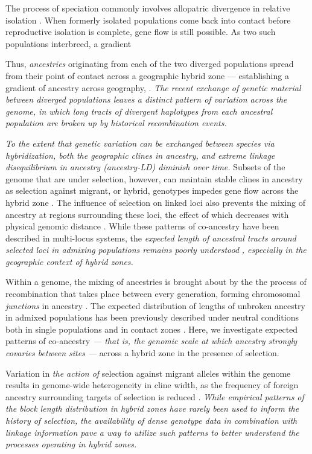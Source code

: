 \documentclass[11pt,letterpaper]{article}
\newcommand{\alisa}[1]{{\em \color{red} #1}}
\newcommand{\yb}[1]{{\em \color{magenta} #1}}
\begin{document}
The process of speciation commonly involves allopatric divergence in relative isolation \citep{Coyne2004}.  
When formerly isolated populations come back into contact 
before reproductive isolation is complete, gene flow is still possible. 
As two such populations interbreed,
a gradient

Thus, \alisa{ancestries} originating from each of the two diverged populations spread from their point of contact across a geographic hybrid zone 
--- establishing a gradient of ancestry across geography, \citep{Barton1985}. 
\yb{The recent exchange of genetic material between diverged populations leaves a distinct pattern of variation across the genome, in which long tracts of divergent haplotypes from each ancestral population  are broken up by historical recombination events.}  


\yb{To the extent that  genetic variation can be exchanged between species via hybridization, both the geographic clines in ancestry, and extreme linkage disequilibrium in ancestry (ancestry-LD) diminish over time.} Subsets of the genome that are under selection, however, can maintain stable clines in ancestry as selection against migrant, or hybrid, genotypes impedes gene flow across the hybrid zone \citep{Barton1979a}. The influence of selection on linked loci also prevents the mixing of ancestry at regions surrounding these loci, the effect of which decreases with physical genomic distance \citep{Barton1986,Barton1983}. While these patterns of co-ancestry have been described in multi-locus systems, the  \yb{expected length of ancestral tracts around selected loci in admixing populations remains poorly understood}\alisa{, especially in the geographic context of hybrid zones.}


Within a genome, the mixing of ancestries is brought about by the the process of recombination that takes place between every generation, forming chromosomal \emph{junctions} in ancestry \citep{Fisher1954, Chapman2002, Baird2003}.   
The expected distribution of lengths of unbroken ancestry in admixed populations has been previously described under neutral conditions both in single populations and in contact zones \citep[e.g.][]{Gravel2012,Sedghifar2015}.  Here, we investigate expected patterns of co-ancestry \yb{ --- that is, the genomic scale at which ancestry strongly covaries between sites --- } across a hybrid zone in the presence of selection. 

Variation in \yb{ the action of } selection against migrant alleles within the genome results in genome-wide heterogeneity in cline width, as the frequency of foreign ancestry surrounding targets of selection is reduced \citep{Barton1979}. 
\yb{While empirical patterns of the block length distribution in hybrid zones have rarely been used to inform the history of selection,}  \alisa{the availability of dense genotype data in combination with linkage information pave a way to utilize such patterns to better understand the processes operating in hybrid zones. } %
\end{document}
